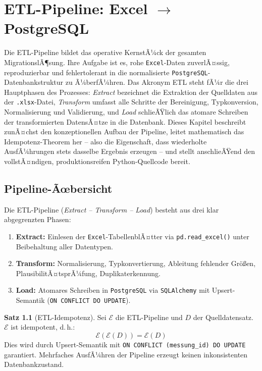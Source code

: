 ﻿\documentclass[12pt,a4paper]{report}
\theoremstyle{definition}
\newtheorem{theorem}{Satz}[section]
\theoremstyle{remark}
\newcommand{\excel}{\texttt{Excel}}
\newcommand{\pg}{\texttt{PostgreSQL}}
\newcommand{\sqlalchemy}{\texttt{SQLAlchemy}}
\newcommand{\code}[1]{\texttt{#1}}
\begin{document}
\chapter{ETL-Pipeline: Excel \texorpdfstring{$\to$}{->} PostgreSQL}

Die ETL-Pipeline bildet das operative KernstÃ¼ck der gesamten MigrationslÃ¶sung. Ihre Aufgabe ist es, rohe \excel{}-Daten zuverlÃ¤ssig, reproduzierbar und fehlertolerant in die normalisierte \pg{}-Datenbankstruktur zu Ã¼berfÃ¼hren. Das Akronym ETL steht fÃ¼r die drei Hauptphasen des Prozesses: \textit{Extract} bezeichnet die Extraktion der Quelldaten aus der \code{.xlsx}-Datei, \textit{Transform} umfasst alle Schritte der Bereinigung, Typkonversion, Normalisierung und Validierung, und \textit{Load} schlieÃŸlich das atomare Schreiben der transformierten DatensÃ¤tze in die Datenbank. Dieses Kapitel beschreibt zunÃ¤chst den konzeptionellen Aufbau der Pipeline, leitet mathematisch das Idempotenz-Theorem her -- also die Eigenschaft, dass wiederholte AusfÃ¼hrungen stets dasselbe Ergebnis erzeugen -- und stellt anschlieÃŸend den vollstÃ¤ndigen, produktionsreifen Python-Quellcode bereit.

\section{Pipeline-Ãœbersicht}
Die ETL-Pipeline (\textit{Extract -- Transform -- Load}) besteht aus
drei klar abgegrenzten Phasen:

\begin{enumerate}[leftmargin=1.5em]
  \item \textbf{Extract:} Einlesen der \excel-TabellenblÃ¤tter via
        \code{pd.read\_excel()} unter Beibehaltung aller Datentypen.
  \item \textbf{Transform:} Normalisierung, Typkonvertierung, Ableitung
        fehlender Gr\"o\ss{}en, PlausibilitÃ¤tsprÃ¼fung, Duplikaterkennung.
  \item \textbf{Load:} Atomares Schreiben in \pg{} via \sqlalchemy{}
        mit Upsert-Semantik (\code{ON CONFLICT DO UPDATE}).
\end{enumerate}

\begin{theorem}[ETL-Idempotenz]
  Sei $\mathcal{E}$ die ETL-Pipeline und $D$ der Quelldatensatz.
  $\mathcal{E}$ ist idempotent, d.\,h.:
  \[
    \mathcal{E}(\mathcal{E}(D)) = \mathcal{E}(D)
  \]
  Dies wird durch Upsert-Semantik mit \code{ON CONFLICT (messung\_id)
  DO UPDATE} garantiert. Mehrfaches AusfÃ¼hren der Pipeline erzeugt
  keinen inkonsistenten Datenbankzustand.
\end{theorem}
\end{document}
